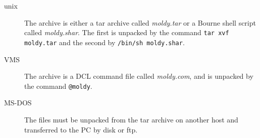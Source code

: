 \documentclass[twoside]{report}
\begin{document}
\begin{description}
\item[unix]  The archive is either a tar archive called {\em
moldy.tar\/} or a Bourne shell script called {\em moldy.shar}. The first
is unpacked by the command \texttt{tar xvf moldy.tar} and the second by
\texttt{/bin/sh moldy.shar}.

\item[VMS]  The archive is a DCL command file called {\em moldy.com},
and is unpacked by the command \texttt{@moldy}.

\item[MS-DOS] The files must be unpacked from the tar archive on
another host and transferred to the PC by disk or ftp.

\end{description}


\end{document}
